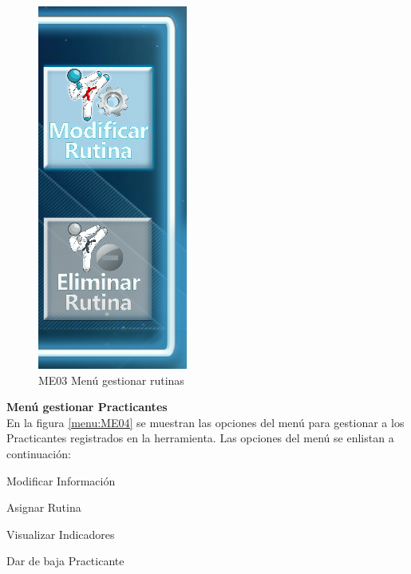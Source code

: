 \begin{figure}[H]
	\centering
		\includegraphics[scale=0.5]{./Figuras/Menus/ME03Gestionar_rutinas}
	\caption{ME03 Menú gestionar rutinas}
	\label{menu:ME03}
\end{figure}

\textbf{\textcolor[rgb]{0, 0, 0.545098}{Menú gestionar Practicantes}}\\

En la figura \ref{menu:ME04} se muestran las opciones del menú para gestionar a los Practicantes registrados en la herramienta. Las opciones del menú se enlistan a continuación:\\

\begin{compactitem} 
	\setlength\itemsep{-0.25em}
	\item Modificar Información
	\item Asignar Rutina
	\item Visualizar Indicadores
	\item Dar de baja Practicante
\end{compactitem} 

